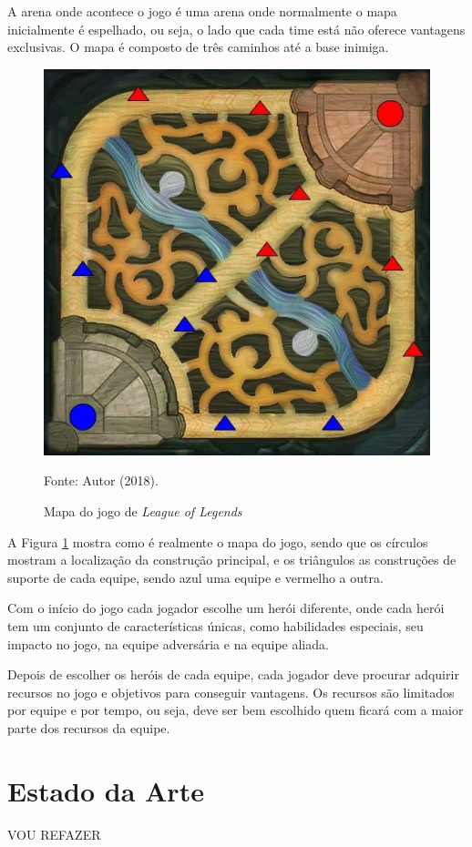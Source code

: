 	A arena onde acontece o jogo é uma arena onde normalmente o mapa inicialmente é  espelhado,  ou  seja, o lado que cada time está não  oferece vantagens  exclusivas.  O mapa é composto  de  três caminhos até a base inimiga.
    

\begin{figure}[H]
	\caption{Mapa do jogo de \textit{League of Legends}}
	\begin{center}
		\includegraphics{imagens/mapa_lol.jpg}
	\end{center}
	\small{Fonte: Autor (2018).}
	\label{fig:mapa_lol}
\end{figure}

	A Figura \ref{fig:mapa_lol} mostra como é realmente o mapa do jogo, sendo que os círculos mostram a localização da construção principal, e os triângulos as construções de suporte de cada equipe, sendo azul uma equipe e vermelho a outra.
    
	Com o início do jogo cada jogador escolhe  um  herói  diferente, onde  cada  herói tem um conjunto de características únicas, como habilidades especiais,  seu impacto  no jogo,  na equipe adversária e na equipe aliada.
    
	Depois de escolher os heróis de cada equipe, cada jogador deve procurar adquirir recursos no jogo e objetivos para conseguir vantagens. Os recursos são limitados por equipe e por tempo, ou seja, deve ser bem escolhido quem ficará com a maior parte dos recursos da equipe.

\section{Estado da Arte}


{\Huge VOU REFAZER}
